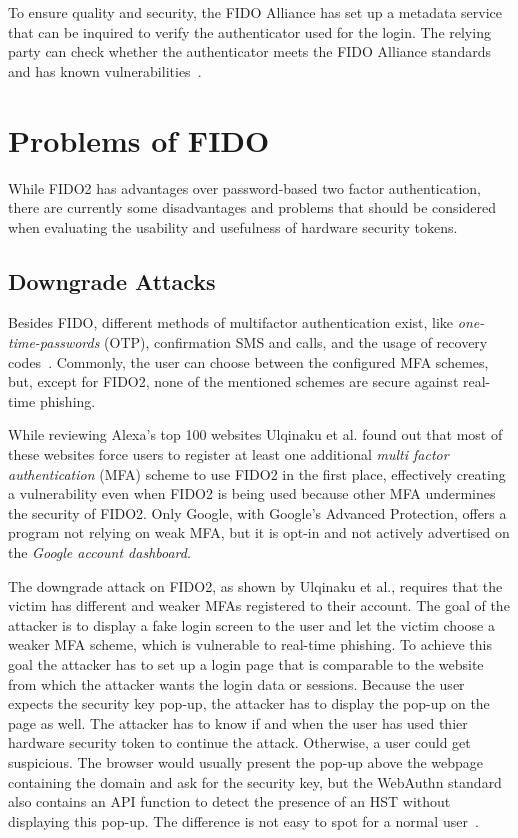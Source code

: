 \documentclass[runningheads]{llncs}
\begin{document}
To ensure quality and security, the FIDO Alliance has set up a metadata service that can be inquired to verify the authenticator used for the login. The relying party can check whether the authenticator meets the FIDO Alliance standards and has known vulnerabilities~\cite{9099190}.

\section{Problems of FIDO}
While FIDO2 has advantages over password-based two factor authentication, there are currently some disadvantages and problems that should be considered when evaluating the usability and usefulness of hardware security tokens.

\subsection{Downgrade Attacks}
Besides FIDO, different methods of multifactor authentication exist, like \textit{one-time-passwords} (OTP), confirmation SMS and calls, and the usage of recovery codes~\cite{000004}. Commonly, the user can choose between the configured MFA schemes, but, except for FIDO2, none of the mentioned schemes are secure against real-time phishing.

While reviewing Alexa's top 100 websites Ulqinaku et al. found out that most of these websites force users to register at least one additional \textit{multi factor authentication} (MFA) scheme to use FIDO2 in the first place, effectively creating a vulnerability even when FIDO2 is being used because other MFA undermines the security of FIDO2. Only Google, with Google's Advanced Protection, offers a program not relying on weak MFA, but it is opt-in and not actively advertised on the \textit{Google account dashboard}.

The downgrade attack on FIDO2, as shown by Ulqinaku et al., requires that the victim has different and weaker MFAs registered to their account. The goal of the attacker is to display a fake login screen to the user and let the victim choose a weaker MFA scheme, which is vulnerable to real-time phishing. To achieve this goal the attacker has to set up a login page that is comparable to the website from which the attacker wants the login data or sessions. Because the user expects the security key pop-up, the attacker has to display the pop-up on the page as well. The attacker has to know if and when the user has used thier hardware security token to continue the attack. Otherwise, a user could get suspicious. The browser would usually present the pop-up above the webpage containing the domain and ask for the security key, but the WebAuthn standard also contains an API function to detect the presence of an HST without displaying this pop-up. The difference is not easy to spot for a normal user~\cite{274610}.
\end{document}
